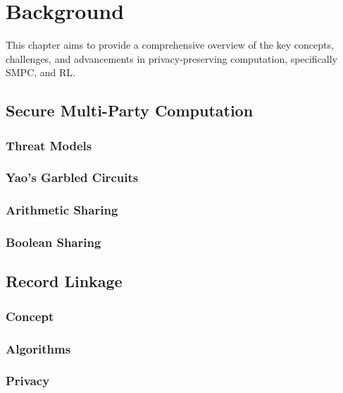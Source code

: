 \chapter{Background}\label{Background}
This chapter aims to provide a comprehensive overview of the key concepts, challenges, and advancements in privacy-preserving computation, specifically \ac{SMPC}, and \ac{RL}.
\section{Secure Multi-Party Computation}

\subsection{Threat Models}
\subsection{Yao's Garbled Circuits}
\subsection{Arithmetic Sharing}
\subsection{Boolean Sharing}
\section{Record Linkage}
\subsection{Concept}
\subsection{Algorithms}
\subsection{Privacy}
